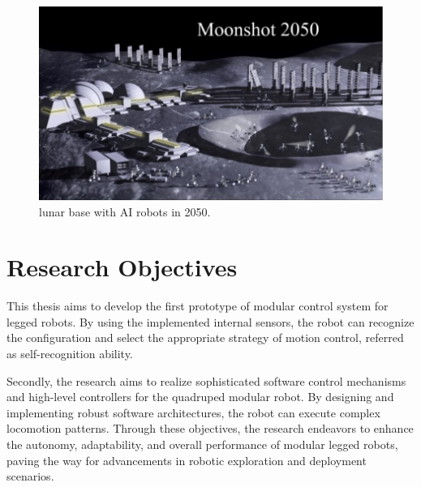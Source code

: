 \begin{figure}[t]
  \centering
  \includegraphics[width=\linewidth]{./fig/intro/moonshot.pdf}
  \vspace{2mm}
  \caption{lunar base with AI robots in 2050. \cite{moonshotGoal3B}}\label{fig moonshot}
\end{figure}

\section{Research Objectives}
This thesis aims to develop the first prototype of modular control system for legged robots. By using the implemented internal sensors, the robot can recognize the configuration and select the appropriate strategy of motion control, referred as self-recognition ability.

Secondly, the research aims to realize sophisticated software control mechanisms and high-level controllers for the quadruped modular robot. By designing and implementing robust software architectures, the robot can execute complex locomotion patterns. Through these objectives, the research endeavors to enhance the autonomy, adaptability, and overall performance of modular legged robots, paving the way for advancements in robotic exploration and deployment scenarios.\\



